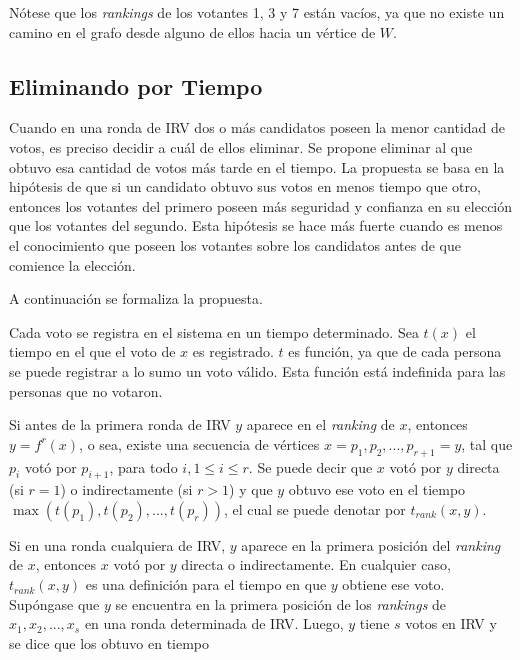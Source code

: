 N\'otese que los \textit{rankings}  de los votantes 1, 3 y 7 est\'an vac\'ios, ya que no existe un camino en el grafo desde alguno de ellos hacia un v\'ertice de $W$.

\subsection{Eliminando por Tiempo}
Cuando en una ronda de IRV dos o m\'as candidatos poseen la menor cantidad de votos, es preciso decidir a cu\'al de ellos eliminar. Se propone eliminar al que obtuvo esa cantidad de votos m\'as tarde en el tiempo. La propuesta se basa en la hip\'otesis de que si un candidato obtuvo sus votos en menos tiempo que otro, entonces los votantes del primero poseen m\'as seguridad y confianza en su elecci\'on que los votantes del segundo. Esta hip\'otesis se hace m\'as fuerte cuando es menos el conocimiento que poseen los votantes sobre los candidatos antes de que comience la elecci\'on. 

A continuaci\'on se formaliza la propuesta.


Cada voto se registra en el sistema en un tiempo determinado. Sea $t(x)$ el tiempo en el que el voto de $x$ es registrado. $t$ es funci\'on, ya que de cada persona se puede registrar a lo sumo un voto v\'alido. Esta funci\'on est\'a indefinida para las personas que no votaron.

Si antes de la primera ronda de IRV $y$ aparece en el \textit{ranking} de $x$, entonces $y = f^r(x)$, o sea, existe una secuencia de v\'ertices $x = p_1, p_2, ..., p_{r+1} = y$, tal que $p_i$ vot\'o por $p_{i+1}$, para todo $i, 1 \leq i \leq r$.  Se puede decir que $x$ vot\'o por $y$ directa (si $r=1$) o indirectamente (si $r>1$) y que $y$ obtuvo ese voto en el tiempo $\max (t(p_1), t(p_2), ..., t(p_r))$, el cual se puede denotar por $t_{rank}(x, y)$. 

Si en una ronda cualquiera de IRV, $y$ aparece en la primera posici\'on del \textit{ranking} de $x$, entonces $x$ vot\'o por $y$ directa o indirectamente. En cualquier caso, $t_{rank}(x, y)$ es una definici\'on para el tiempo en que $y$ obtiene ese voto. Sup\'ongase que $y$ se encuentra en la primera posici\'on de los \textit{rankings} de $x_1, x_2, ..., x_s$ en una ronda determinada de IRV. Luego, $y$ tiene $s$ votos en IRV y se dice que los obtuvo en tiempo 

